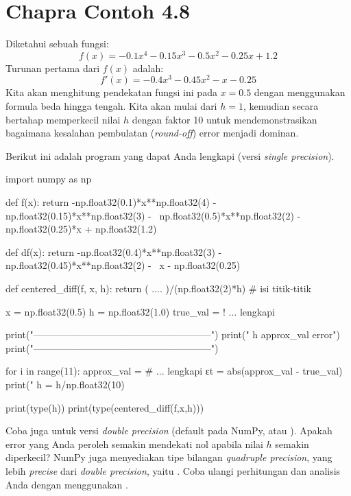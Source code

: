 \section{Chapra Contoh 4.8}
Diketahui sebuah fungsi:
\begin{equation}
f(x) = -0.1x^4 - 0.15x^3 - 0.5x^2 - 0.25x + 1.2
\end{equation}
Turunan pertama dari $f(x)$ adalah:
\begin{equation}
f'(x) = -0.4x^3 - 0.45x^2 - x - 0.25
\end{equation}
Kita akan menghitung pendekatan fungsi ini pada $x=0.5$ dengan menggunakan
formula beda hingga tengah. Kita akan mulai dari $h=1$, kemudian secara bertahap
memperkecil nilai $h$ dengan faktor 10 untuk mendemonstrasikan bagaimana
kesalahan pembulatan (\textit{round-off}) error menjadi dominan.

\begin{soal}
Berikut ini adalah program yang dapat Anda lengkapi (versi \textit{single precision}).
\begin{pythoncode}
import numpy as np

def f(x):
  return -np.float32(0.1)*x**np.float32(4) - np.float32(0.15)*x**np.float32(3) - \
  np.float32(0.5)*x**np.float32(2) - np.float32(0.25)*x + np.float32(1.2)
  
def df(x):
  return -np.float32(0.4)*x**np.float32(3) - np.float32(0.45)*x**np.float32(2) - \
  x - np.float32(0.25)
  
def centered_diff(f, x, h):
  return ( .... )/(np.float32(2)*h) # isi titik-titik
  
  x = np.float32(0.5)
  h = np.float32(1.0)
  true_val = ! ... lengkapi
  
  print("--------------------------------------------------------")
  print("           h             approx_val             error")
  print("--------------------------------------------------------")
  
for i in range(11):
  approx_val = # ... lengkapi
  εt = abs(approx_val - true_val)
  print("%
  h = h/np.float32(10)

print(type(h))
print(type(centered_diff(f,x,h)))  
\end{pythoncode}
Coba juga untuk versi \textit{double precision} (default pada NumPy,
atau ).
Apakah error yang Anda peroleh semakin mendekati nol apabila nilai $h$ semakin
diperkecil?
NumPy juga menyediakan tipe bilangan \textit{quadruple precision}, yang lebih
\textit{precise} dari \textit{double precision}, yaitu
. Coba ulangi perhitungan dan analisis Anda dengan
menggunakan \txtinline{np.float128}.
\end{soal}